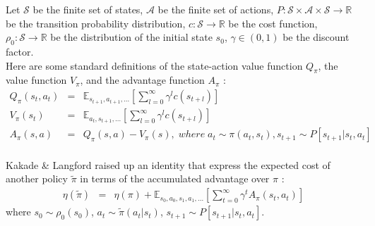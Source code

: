 \documentclass{article}
\begin{document}
Let $\mathcal{S}$ be the finite set of states, $\mathcal{A}$ be the finite set of actions, $P:\mathcal{S}\times \mathcal{A}\times\mathcal{S}\rightarrow \mathbb{R}$ be the transition probability distribution, $c:\mathcal{S}\rightarrow \mathbb{R}$ be the cost function, $\rho_{0}:\mathcal{S}\rightarrow\mathbb{R}$ be the distribution of the initial state $s_{0}$, $\gamma\in (0,1)$ be the discount factor. \\

Here are some standard definitions of the state-action value function $Q_{\pi}$, the value function $V_{\pi}$, and the advantage function $A_{\pi}$ :
\begin{eqnarray}
Q_{\pi} (s_{t}, a_{t}) &=& \mathbb{E}_{s_{t+1}, a_{t+1}, ...}\left[\sum_{l=0}^{\infty}\gamma^{l}c(s_{t+l})\right]\\
V_{\pi}(s_{t}) &=& \mathbb{E}_{a_{t},s_{t+1},...}\left[\sum_{l=0}^{\infty}\gamma^{l}c(s_{t+l})\right]\\
A_{\pi}(s,a) &=& Q_{\pi}(s,a) - V_{\pi}(s), \;where\; a_{t}\sim \pi(a_{t}, s_{t}), s_{t+1}\sim P[s_{t+1}|s_{t},a_{t}]
\end{eqnarray}\\

Kakade \& Langford raised up an identity that express the expected cost of another policy $\tilde{\pi}$ in terms of the accumulated advantage over $\pi$ :
\begin{eqnarray}
\eta(\tilde{\pi}) &=& \eta(\pi) + \mathbb{E}_{s_{0},a_{0},s_{1},a_{1},...}\left[\sum_{t=0}^{\infty}\gamma^{t}A_{\pi}(s_{t},a_{t})\right]
\end{eqnarray}
where $s_{0}\sim \rho_{0}(s_{0})$, $a_{t}\sim \tilde{\pi}(a_{t}|s_{t})$, $s_{t+1}\sim P[s_{t+1}|s_{t},a_{t}]$.\\
\end{document}

